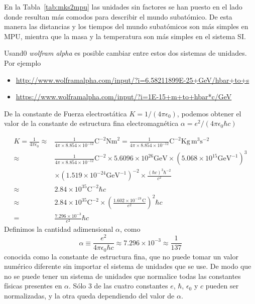 \begin{frame}
En la Tabla~\ref{tab:mks2mpu} las unidades sin factores se han puesto en el lado donde resultan más comodos para describir el mundo subatómico. De esta manera las distancias y los tiempos del mundo subatómicos son más simples en MPU, mientra que la masa y la temperatura son más simples en el sistema SI.




Usand0 \emph{wolfram alpha}  es posible cambiar entre estos dos sistemas de unidades. Por ejemplo

\begin{itemize}
\item \url{http://www.wolframalpha.com/input/?i=6.58211899E-25+GeV/hbar+to+s}
\item \url{https://www.wolframalpha.com/input/?i=1E-15+m+to+hbar*c/GeV}
\end{itemize}

De la constante de Fuerza electrostática $K=1/(4\pi\epsilon_0)$, podemos obtener el valor de la constante de estructura fina electromagnética $\alpha=e^2/(4\pi\epsilon_0\hbar c)$

\begin{align*}
  K=\frac{1}{4\pi\epsilon_0}\approx&\frac{1}{4\pi\times8.854\times10^{-12}}\text{C}^{-2}\text{Nm}^2
  =\frac{1}{4\pi\times8.854\times10^{-12}}\text{C}^{-2}\text{Kg}\,\text{m}^3\text{s}^{-2}\\
  \approx&\frac{1}{4\pi\times8.854\times10^{-12}}\text{C}^{-2}\times5.6096\times10^{26}\text{GeV}
  \times(5.068\times10^{15}\text{GeV}^{-1})^3\\
  &\times(1.519\times10^{-24}\text{GeV}^{-1})^{-2}\times\frac{(\hbar c)^3\hbar^{-2}}{c^2}\\
  \approx&2.84\times10^{35}\text{C}^{-2}\hbar c\\
  \approx&2.84\times10^{35}\text{C}^{-2}\times
  \left(
    \frac{1.602\times10^{-19}\,\text{C}}{e^2}
  \right)^2\hbar c\\
  =&\frac{7.296\times10^{-3}}{e^2}\hbar c
\end{align*}
Definimos la cantidad adimensional $\alpha$, como
\begin{equation*}
  \alpha\equiv\frac{e^2}{4\pi\epsilon_0\hbar c}
\approx7.296\times10^{-3}\approx\frac{1}{137}
\end{equation*}
conocida como la constante de estructura fina, que no puede tomar un
valor numérico diferente sin importar el sistema de unidades que se
use. De modo que no se puede tener un sistema de unidades que
normalice todas las constantes físicas presentes en
$\alpha$. Sólo 3 de las cuatro constantes $e$, $\hbar$, $\epsilon_0$
y $c$ pueden ser normalizadas, y la otra queda dependiendo del valor
de $\alpha$.


\end{frame}
